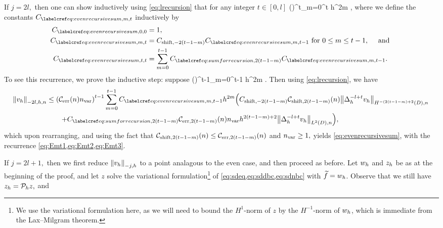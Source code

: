 If $j = 2l,$ then one can show inductively using \cref{eq:lrecursion} that for any integer $t \in [0,l]$
\beq\label{eq:evenrecursivesum}
 \leq \mleft(\En\nvar\mright)^t\sum_{m=0}^t  h^{2m}  ,
\eeq
{}
where we define the constants $\Efn{m,t}$ inductively by
\begin{align}
\label{eq:Emt1}\Efn{0,0} &=1,\\
\label{eq:Emt2}\Efn{m,t} &= \Cshiftfn{2(t-1-m)} \Efn{m,t-1} \tfor 0 \leq m \leq t-1, \quad\tand\\
\label{eq:Emt3}\Efn{t,t} &= \sum_{m=0}^{t-1} \Csumrecfn{2(t-1-m)} \Efn{m,t-1}.
\end{align}
To see this recurrence, we prove the inductive step: suppose
\beqs
{} \leq \mleft(\En\nvar\mright)^{t-1}\sum_{m=0}^{t-1}  h^{2m} .
\eeqs
Then using \cref{eq:lrecursion}, we have
\begin{align*}
\Nfn{-2l,h,n}{\vh} &\leq \mleft(\En\nvar\mright)^{t-1}\sum_{m=0}^{t-1} \Efn{m,t-1} h^{2m} \mleft(\Cshiftfn{2(t-1-m)}\shiftn{2(t-1-m)} \NHnfn{-(2(t-1-m)+2}{D}{\Deltah^{-l+t} \vh}\mright.\\
&\quad\quad\mleft.+ \Csumrecfn{2(t-1-m)} \errn{2(t-1-m)} \nvar h^{2(t-1-m)+2} \NLtDn{\Deltah^{-l+t} \vh}\mright),
\end{align*}
which upon rearranging, and using the fact that $\shiftn{2(t-1-m)} \leq \errn{2(t-1-m)}$ and $n_{\mathrm{var}} \geq 1,$ yields \cref{eq:evenrecursivesum}, with the recurrence \cref{eq:Emt1,eq:Emt2,eq:Emt3}.

If $j=2l+1,$ then we first reduce $\Nfn{-j,h}{\vh}$ to a point analagous to the even case, and then proceed as before. Let $w_{h}$ and $z_{h}$ be as at the beginning of the proof, and let $z$ solve the variational formulation\footnote{We use the variational formulation here, as we will need to bound the $H^1$-norm of $z$ by the $H^{-1}$-norm of $w_{h}$, which is immediate from the Lax--Milgram theorem.}  of \cref{eq:sdeq,eq:sddbc,eq:sdnbc} with $\widetilde{f} = w_{h}$. Observe that we still have $z_{h} = \mathcal P_{h} z,$ and

